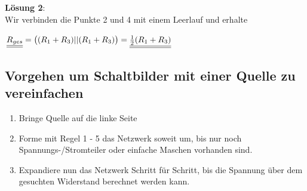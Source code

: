 \textbf{Lösung 2}: \\
Wir verbinden die Punkte 2 und 4 mit einem Leerlauf und erhalte
\begin{center}
	$\underline{\underline{R_{ges}}} = \big( (R_1 + R_3) || (R_1 + R_3) \big) = \underline{\underline{\frac{1}{2}(R_1 + R_3)}}$
\end{center}


\iend


\newpage

\subsection{Vorgehen um Schaltbilder mit einer Quelle zu vereinfachen}
\begin{enumerate}
	\item Bringe Quelle auf die linke Seite
	\item Forme mit Regel 1 - 5 das Netzwerk soweit um, bis nur noch Spannungs-/Stromteiler oder einfache Maschen vorhanden sind.
	\item Expandiere nun das Netzwerk Schritt für Schritt, bis die Spannung über dem gesuchten Widerstand berechnet werden kann.
\end{enumerate}

